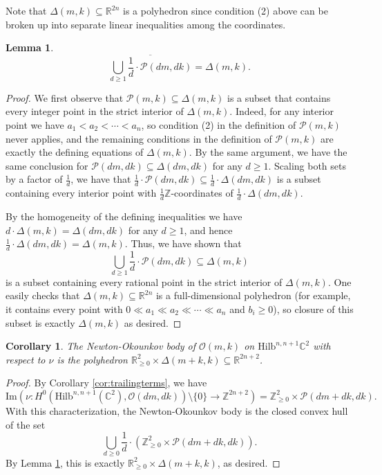 \documentclass[12pt]{amsart}
\newcommand{\Hilb}{\mathrm{Hilb}}
\newcommand{\C}{\mathbb{C}}
\newcommand{\Z}{\mathbb{Z}}
\newcommand{\R}{\mathbb{R}}
\newcommand{\CO}{\mathcal{O}}
\numberwithin{equation}{section}
\newtheorem{corollary}[theorem]{Corollary}
\newtheorem{lemma}[theorem]{Lemma}
\theoremstyle{definition}
\begin{document}
Note that $\Delta(m,k)\subseteq \R^{2n}$ is a polyhedron since condition (2) above can be broken up into separate linear inequalities among the coordinates.

\begin{lemma}\label{lem:convexHull}
    \[ \overline{\bigcup_{d\geq 1} \frac{1}{d} \cdot \mathcal{P}(d m, d k)} = \Delta(m,k). \]
\end{lemma}

\begin{proof}
    We first observe that $\mathcal{P}(m,k)\subseteq \Delta(m,k)$ is a subset that contains every integer point in the strict interior of $\Delta(m,k)$. Indeed, for any interior point we have $a_1<a_2<\cdots<a_n$, so condition (2) in the definition of $\mathcal{P}(m,k)$ never applies, and the remaining conditions in the definition of $\mathcal{P}(m,k)$ are exactly the defining equations of $\Delta(m,k)$. By the same argument, we have the same conclusion for $\mathcal{P}(dm,dk)\subseteq \Delta(dm,dk)$ for any $d\geq 1$. Scaling both sets by a factor of $\frac{1}{d}$, we have that $\frac{1}{d}\cdot \mathcal{P}(dm,dk)\subseteq \frac{1}{d}\cdot\Delta(dm,dk)$ is a subset containing every interior point with $\frac{1}{d}\Z$-coordinates of $\frac{1}{d}\cdot\Delta(dm,dk)$.
    
    By the homogeneity of the defining inequalities we have $d\cdot \Delta(m,k) = \Delta(dm,dk)$ for any $d\geq 1$, and hence $\frac{1}{d}\cdot\Delta(dm,dk) = \Delta(m,k)$. Thus, we have shown that 
    \[ \bigcup_{d\geq 1} \frac{1}{d} \cdot \mathcal{P}(d m, d k) \subseteq \Delta(m,k) \]
    is a subset containing every rational point in the strict interior of $\Delta(m,k)$. One easily checks that $\Delta(m,k)\subseteq \R^{2n}$ is a full-dimensional polyhedron (for example, it contains every point with $0\ll a_1\ll a_2\ll \cdots\ll a_n$ and $b_i\geq 0$), so closure of this subset is exactly $\Delta(m,k)$ as desired.
\end{proof}

\begin{corollary}
    The Newton-Okounkov body of $\CO(m,k)$ on $\Hilb^{n,n+1}\C^2$ with respect to $\nu$ is the polyhedron $\R^2_{\geq 0}\times \Delta(m+k,k)\subseteq \R^{2n+2}$.
\end{corollary}

\begin{proof}
    By Corollary \ref{cor:trailingterms}, we have
    \[ \text{Im}(\nu:H^0(\Hilb^{n,n+1}(\C^2),\mathcal{O}(dm,dk))\setminus\{0\}\to \Z^{2n+2}) = \Z^2_{\ge 0}\times \mathcal{P}(dm+dk,dk). \]
    With this characterization, the Newton-Okounkov body is the closed convex hull of the set
    \[ \bigcup_{d \geq 0} \frac{1}{d}\cdot \left(\Z^2_{\ge 0}\times \mathcal{P}(dm+dk,dk)\right). \]
    By Lemma \ref{lem:convexHull}, this is exactly $\R^2_{\ge 0}\times \Delta(m+k,k)$, as desired.
\end{proof}
\end{document}
